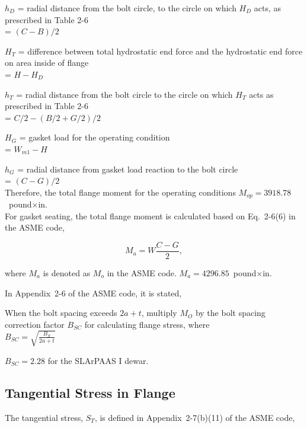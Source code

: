 $h_D$ = radial distance from the bolt circle, to the circle on which 
$H_D$ acts, as prescribed in Table 2-6 \\
= $(C-B)/2$

$H_T$ = difference between total hydrostatic end force and the hydrostatic 
end force on area inside of flange \\
= $H - H_D$

$h_T$ = radial distance from the bolt circle to the circle on which 
$H_T$ acts as prescribed in Table 2-6 \\ 
= $C/2 - (B/2+G/2)/2$

$H_G$ = gasket load for the operating condition \\
= $W_{m1} - H$

$h_G$ = radial distance from gasket load reaction to the bolt circle \\
= $(C-G)/2$ \\

Therefore, the total flange moment for the operating conditions
$M_{op} = 3918.78$~pound$\times$in.\\

For gasket seating, the total flange moment is calculated based on
Eq.~2-6(6) in the ASME code,

\begin{equation}
    M_a = W\frac{C-G}{2},
\end{equation}

where $M_a$ is denoted as $M_o$ in the ASME code.
$M_a = 4296.85$~pound$\times$in.

In Appendix~2-6 of the ASME code, it is stated,

\begin{displayquote}
    When the bolt spacing exceeds $2a + t$, multiply $M_O$ by the bolt spacing 
    correction factor $B_{SC}$ for calculating flange stress, where \\

    $B_{SC} = \sqrt{\frac{B_S}{2a+t}}$
\end{displayquote}

$B_{SC} = 2.28$ for the SLArPAAS I dewar.

\subsection{Tangential Stress in Flange}
\label{app:tangential_stress}

The tangential stress, $S_T$, is defined in Appendix~2-7(b)(11) of the
ASME code,

